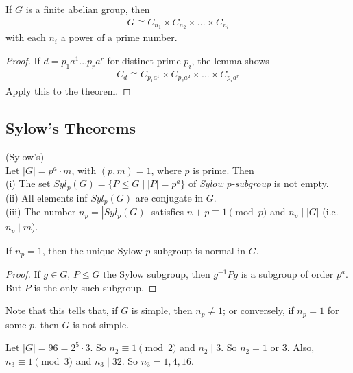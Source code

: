 \documentclass[a4paper]{article}
\begin{document}
\begin{coro}
If $G$ is a finite abelian group, then
\begin{equation*}
\begin{aligned}
G \cong C_{n_1} \times C_{n_2} \times ... \times C_{n_l}
\end{aligned}
\end{equation*}
with each $n_i$ a power of a prime number.
\begin{proof}
If $d=p_1a^1...p_ra^r$ for distinct prime $p_i$, the lemma shows
\begin{equation*}
\begin{aligned}
C_d \cong C_{p_1a^1} \times C_{p_2a^2} \times ... \times C_{p_ra^r}
\end{aligned}
\end{equation*}
Apply this to the theorem.
\end{proof}
\end{coro}

\subsection{Sylow's Theorems}
\begin{thm} (Sylow's)\\
Let $|G| =p^a \cdot m$, with $(p,m) = 1$, where $p$ is prime. Then\\
(i) The set $Syl_p(G)=\{P \leq G \mid |P| = p^a\}$ of \emph{Sylow $p$-subgroup} is not empty.\\
(ii) All elements inf $Syl_p(G)$ are conjugate in $G$.\\
(iii) The number $n_p = |Syl_p(G)|$ satisfies $n+p \equiv 1 \pmod p$ and $n_p \mid |G|$ (i.e. $n_p \mid m$).
\end{thm}

\begin{lemma}
If $n_p=1$, then the unique Sylow $p$-subgroup is normal in $G$.
\begin{proof}
If $g \in G$, $P \leq G$ the Sylow subgroup, then $g^{-1}Pg$ is a subgroup of order $p^a$. But $P$ is the only such subgroup.
\end{proof}
\end{lemma}

Note that this tells that, if $G$ is simple, then $n_p \neq 1$; or conversely, if $n_p = 1$ for some $p$, then $G$ is not simple.

\begin{eg}
Let $|G| = 96 = 2^5 \cdot 3$. So $n_2 \equiv 1 \pmod 2$ and $n_2 \mid 3$. So $n_2 = 1$ or $3$. Also, $n_3 \equiv 1 \pmod 3$ and $n_3 \mid 32$. So $n_3 = 1,4,16$.
\end{eg}
\end{document}
